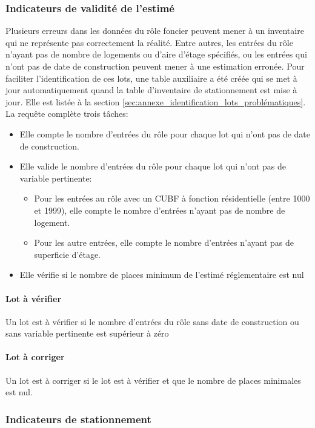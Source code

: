     \subsubsection{Indicateurs de validité de l'estimé}
    Plusieurs erreurs dans les données du rôle foncier peuvent mener à un inventaire qui ne représente pas correctement la réalité. Entre autres, les entrées du rôle n'ayant pas de nombre de logements ou d'aire d'étage spécifiés, ou les entrées qui n'ont pas de date de construction peuvent mener à une estimation erronée. Pour faciliter l'identification de ces lots, une table auxiliaire a été créée qui se met à jour automatiquement quand la table d'inventaire de stationnement est mise à jour. Elle est listée à la section \ref{sec:annexe_identification_lots_problématiques}. La requête complète trois tâches:
    \begin{itemize}
        \item Elle compte le nombre d'entrées du rôle pour chaque lot qui n'ont pas de date de construction.
        \item Elle valide le nombre d'entrées du rôle pour chaque lot qui n'ont pas de variable pertinente:
        \begin{itemize}
            \item Pour les entrées au rôle avec un \ac{CUBF} à fonction résidentielle (entre 1000 et 1999), elle compte le nombre d'entrées n'ayant pas de nombre de logement.
            \item Pour les autre entrées, elle compte le nombre d'entrées n'ayant pas de superficie d'étage.
        \end{itemize}
        \item Elle vérifie si le nombre de places minimum de l'estimé réglementaire est nul
    \end{itemize}
    \paragraph{Lot à vérifier} Un lot est à vérifier si le nombre d'entrées du rôle sans date de construction ou sans variable pertinente est supérieur à zéro
    \paragraph{Lot à corriger} Un lot est à corriger si le lot est à vérifier et que le nombre de places minimales est nul.
    \subsubsection{Indicateurs de stationnement}
